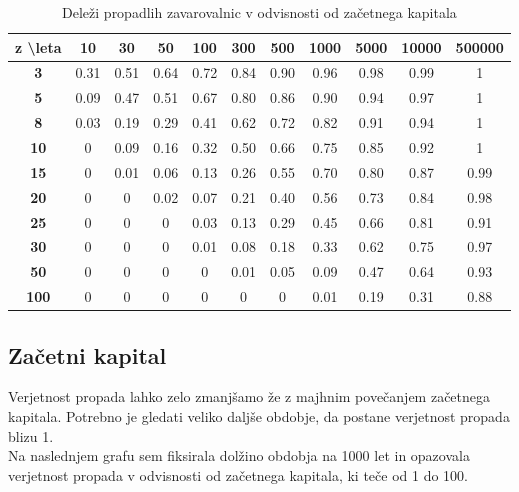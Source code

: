 \documentclass[a4paper,12pt]{homework}
\begin{document}
	\begin{table}[htb]
		\centering
		\caption{Deleži propadlih zavarovalnic v odvisnosti od začetnega kapitala}\vspace{2mm}
		\begin{tabular}{|c|c|c|c|c|c|c|c|c|c|c|}
			\hline
			\textbf{z} \backslash \textbf{leta} & \textbf{10} & \textbf{30} & \textbf{50} & \textbf{100} & \textbf{300} & \textbf{500} & \textbf{1000} & \textbf{5000} & \textbf{10000} & \textbf{500000} \\\hline
			\textbf{3} & 0.31 & 0.51 & 0.64 & 0.72 & 0.84 & 0.90 & 0.96 & 0.98 & 0.99 & 1 \\\hline
			\textbf{5} & 0.09 & 0.47 & 0.51 & 0.67 & 0.80 & 0.86 & 0.90 & 0.94 & 0.97 & 1 \\\hline
			\textbf{8} & 0.03 & 0.19 & 0.29 & 0.41 & 0.62 & 0.72 & 0.82 & 0.91 & 0.94 & 1 \\\hline
			\textbf{10} & 0 & 0.09 & 0.16 & 0.32 & 0.50 & 0.66 & 0.75 & 0.85 & 0.92 & 1 \\\hline
			\textbf{15} & 0 & 0.01 & 0.06 & 0.13 & 0.26 & 0.55 & 0.70 & 0.80 & 0.87 & 0.99 \\\hline
			\textbf{20} & 0 & 0 & 0.02 & 0.07 & 0.21 & 0.40 & 0.56 & 0.73 & 0.84 & 0.98 \\\hline
			\textbf{25} & 0 & 0 & 0 & 0.03 & 0.13 & 0.29 & 0.45 & 0.66 & 0.81 & 0.91 \\\hline
			\textbf{30} & 0 & 0 & 0 & 0.01 & 0.08 & 0.18 & 0.33 & 0.62 & 0.75 & 0.97 \\\hline
			\textbf{50} & 0 & 0 & 0 & 0 & 0.01 & 0.05 & 0.09 & 0.47 & 0.64 & 0.93 \\\hline
			\textbf{100} & 0 & 0 & 0 & 0 & 0 & 0 & 0.01 & 0.19 & 0.31 & 0.88 \\\hline
		\end{tabular}
		\label{tab:my_label}
	\end{table}
	
	\subsection{Začetni kapital}
	Verjetnost propada lahko zelo zmanjšamo že z majhnim povečanjem začetnega kapitala. Potrebno je gledati veliko daljše obdobje, da postane verjetnost propada blizu 1. 
	\\
	\newpage
	Na naslednjem grafu sem fiksirala dolžino obdobja na 1000 let in opazovala verjetnost propada v odvisnosti od začetnega kapitala, ki teče od 1 do 100.
	
\end{document}
